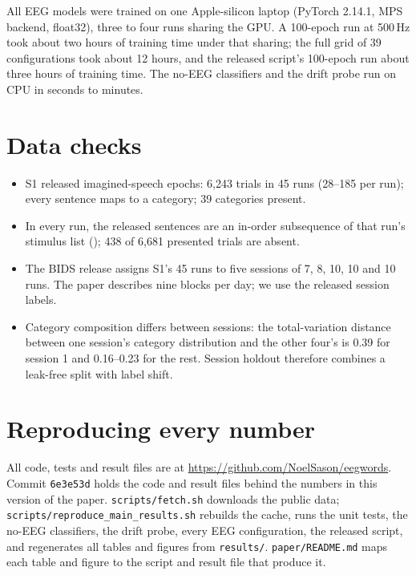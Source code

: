 All EEG models were trained on one Apple-silicon laptop (PyTorch 2.14.1, MPS backend, float32),
three to four runs sharing the GPU. A 100-epoch run at 500\,Hz took about two hours of training time
under that sharing; the full grid of 39 configurations took about 12 hours, and the released script's
100-epoch run about three hours of training time. The no-EEG classifiers and the drift probe run on CPU in seconds to minutes.

\section{Data checks}
\label{app:data}

\begin{itemize}
\item S1 released imagined-speech epochs: 6{,}243 trials in 45 runs (28--185 per run); every
sentence maps to a category; 39 categories present.
\item In every run, the released sentences are an in-order subsequence of that run's stimulus list
(); 438 of 6{,}681 presented trials are absent.
\item The BIDS release assigns S1's 45 runs to five sessions of 7, 8, 10, 10 and 10 runs. The paper
describes nine blocks per day; we use the released session labels.
\item Category composition differs between sessions: the total-variation distance between one
session's category distribution and the other four's is 0.39 for session 1 and 0.16--0.23 for the
rest. Session holdout therefore combines a leak-free split with label shift.
\end{itemize}

\section{Reproducing every number}
\label{app:repro}

All code, tests and result files are at \url{https://github.com/NoelSason/eegwords}. Commit
\texttt{6e3e53d} holds the code and result files behind the numbers in this version of the paper.
\texttt{scripts/fetch.sh} downloads
the public data; \texttt{scripts/reproduce\_main\_results.sh} rebuilds the cache, runs the unit
tests, the no-EEG classifiers, the drift probe, every EEG configuration, the released script, and
regenerates all tables and figures from \texttt{results/}. \texttt{paper/README.md} maps each table
and figure to the script and result file that produce it.
